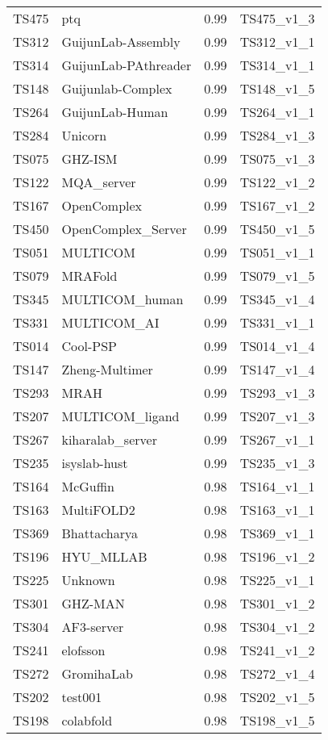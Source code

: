 \begin{longtable}{llll}
TS475 & ptq & 0.99 & TS475\_v1\_3 \\ 
TS312 & GuijunLab-Assembly & 0.99 & TS312\_v1\_1 \\ 
TS314 & GuijunLab-PAthreader & 0.99 & TS314\_v1\_1 \\ 
TS148 & Guijunlab-Complex & 0.99 & TS148\_v1\_5 \\ 
TS264 & GuijunLab-Human & 0.99 & TS264\_v1\_1 \\ 
TS284 & Unicorn & 0.99 & TS284\_v1\_3 \\ 
TS075 & GHZ-ISM & 0.99 & TS075\_v1\_3 \\ 
TS122 & MQA\_server & 0.99 & TS122\_v1\_2 \\ 
TS167 & OpenComplex & 0.99 & TS167\_v1\_2 \\ 
TS450 & OpenComplex\_Server & 0.99 & TS450\_v1\_5 \\ 
TS051 & MULTICOM & 0.99 & TS051\_v1\_1 \\ 
TS079 & MRAFold & 0.99 & TS079\_v1\_5 \\ 
TS345 & MULTICOM\_human & 0.99 & TS345\_v1\_4 \\ 
TS331 & MULTICOM\_AI & 0.99 & TS331\_v1\_1 \\ 
TS014 & Cool-PSP & 0.99 & TS014\_v1\_4 \\ 
TS147 & Zheng-Multimer & 0.99 & TS147\_v1\_4 \\ 
TS293 & MRAH & 0.99 & TS293\_v1\_3 \\ 
TS207 & MULTICOM\_ligand & 0.99 & TS207\_v1\_3 \\ 
TS267 & kiharalab\_server & 0.99 & TS267\_v1\_1 \\ 
TS235 & isyslab-hust & 0.99 & TS235\_v1\_3 \\ 
TS164 & McGuffin & 0.98 & TS164\_v1\_1 \\ 
TS163 & MultiFOLD2 & 0.98 & TS163\_v1\_1 \\ 
TS369 & Bhattacharya & 0.98 & TS369\_v1\_1 \\ 
TS196 & HYU\_MLLAB & 0.98 & TS196\_v1\_2 \\ 
TS225 & Unknown & 0.98 & TS225\_v1\_1 \\ 
TS301 & GHZ-MAN & 0.98 & TS301\_v1\_2 \\ 
TS304 & AF3-server & 0.98 & TS304\_v1\_2 \\ 
TS241 & elofsson & 0.98 & TS241\_v1\_2 \\ 
TS272 & GromihaLab & 0.98 & TS272\_v1\_4 \\ 
TS202 & test001 & 0.98 & TS202\_v1\_5 \\ 
TS198 & colabfold & 0.98 & TS198\_v1\_5 \\ 

\end{longtable}
